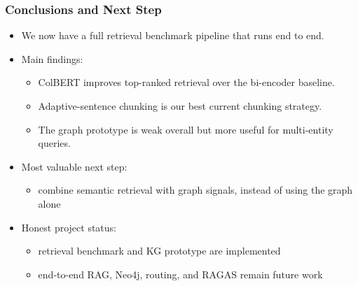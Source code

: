 \documentclass{beamer}
\begin{document}
\begin{frame}
\frametitle{Conclusions and Next Step}
\small
\begin{itemize}
  \item We now have a full retrieval benchmark pipeline that runs end to end.
  \item Main findings:
  \begin{itemize}
    \item ColBERT improves top-ranked retrieval over the bi-encoder baseline.
    \item Adaptive-sentence chunking is our best current chunking strategy.
    \item The graph prototype is weak overall but more useful for multi-entity queries.
  \end{itemize}
  \item Most valuable next step:
  \begin{itemize}
    \item combine semantic retrieval with graph signals, instead of using the graph alone
  \end{itemize}
  \item Honest project status:
  \begin{itemize}
    \item retrieval benchmark and KG prototype are implemented
    \item end-to-end RAG, Neo4j, routing, and RAGAS remain future work
  \end{itemize}
\end{itemize}
\end{frame}
\end{document}
